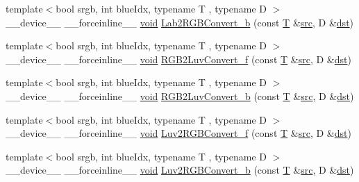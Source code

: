\begin{DoxyCompactItemize}
\item 
{\footnotesize template$<$bool srgb, int blue\-Idx, typename T , typename D $>$ }\\\-\_\-\-\_\-device\-\_\-\-\_\- \-\_\-\-\_\-forceinline\-\_\-\-\_\- \hyperlink{legacy_8hpp_a8bb47f092d473522721002c86c13b94e}{void} \hyperlink{namespacecv_1_1gpu_1_1device_1_1color__detail_a6b0bbe96c8d4e80e88474c4a726bd03e}{Lab2\-R\-G\-B\-Convert\-\_\-b} (const \hyperlink{calib3d_8hpp_a3efb9551a871ddd0463079a808916717}{T} \&\hyperlink{legacy_8hpp_a371cd109b74033bc4366f584edd3dacc}{src}, D \&\hyperlink{photo__c_8h_aed13e2a25279b24dc954073233fef7a5}{dst})
\item 
{\footnotesize template$<$bool srgb, int blue\-Idx, typename T , typename D $>$ }\\\-\_\-\-\_\-device\-\_\-\-\_\- \-\_\-\-\_\-forceinline\-\_\-\-\_\- \hyperlink{legacy_8hpp_a8bb47f092d473522721002c86c13b94e}{void} \hyperlink{namespacecv_1_1gpu_1_1device_1_1color__detail_aace7150463a11bee146c2cf36fdebd8b}{R\-G\-B2\-Luv\-Convert\-\_\-f} (const \hyperlink{calib3d_8hpp_a3efb9551a871ddd0463079a808916717}{T} \&\hyperlink{legacy_8hpp_a371cd109b74033bc4366f584edd3dacc}{src}, D \&\hyperlink{photo__c_8h_aed13e2a25279b24dc954073233fef7a5}{dst})
\item 
{\footnotesize template$<$bool srgb, int blue\-Idx, typename T , typename D $>$ }\\\-\_\-\-\_\-device\-\_\-\-\_\- \-\_\-\-\_\-forceinline\-\_\-\-\_\- \hyperlink{legacy_8hpp_a8bb47f092d473522721002c86c13b94e}{void} \hyperlink{namespacecv_1_1gpu_1_1device_1_1color__detail_a786fe21f347e41d69de6ccb2136b6058}{R\-G\-B2\-Luv\-Convert\-\_\-b} (const \hyperlink{calib3d_8hpp_a3efb9551a871ddd0463079a808916717}{T} \&\hyperlink{legacy_8hpp_a371cd109b74033bc4366f584edd3dacc}{src}, D \&\hyperlink{photo__c_8h_aed13e2a25279b24dc954073233fef7a5}{dst})
\item 
{\footnotesize template$<$bool srgb, int blue\-Idx, typename T , typename D $>$ }\\\-\_\-\-\_\-device\-\_\-\-\_\- \-\_\-\-\_\-forceinline\-\_\-\-\_\- \hyperlink{legacy_8hpp_a8bb47f092d473522721002c86c13b94e}{void} \hyperlink{namespacecv_1_1gpu_1_1device_1_1color__detail_aab1c4297ad9db320e720b1882b6f7708}{Luv2\-R\-G\-B\-Convert\-\_\-f} (const \hyperlink{calib3d_8hpp_a3efb9551a871ddd0463079a808916717}{T} \&\hyperlink{legacy_8hpp_a371cd109b74033bc4366f584edd3dacc}{src}, D \&\hyperlink{photo__c_8h_aed13e2a25279b24dc954073233fef7a5}{dst})
\item 
{\footnotesize template$<$bool srgb, int blue\-Idx, typename T , typename D $>$ }\\\-\_\-\-\_\-device\-\_\-\-\_\- \-\_\-\-\_\-forceinline\-\_\-\-\_\- \hyperlink{legacy_8hpp_a8bb47f092d473522721002c86c13b94e}{void} \hyperlink{namespacecv_1_1gpu_1_1device_1_1color__detail_ad42c96fc54caf7cb75cbd0e47d9c15cc}{Luv2\-R\-G\-B\-Convert\-\_\-b} (const \hyperlink{calib3d_8hpp_a3efb9551a871ddd0463079a808916717}{T} \&\hyperlink{legacy_8hpp_a371cd109b74033bc4366f584edd3dacc}{src}, D \&\hyperlink{photo__c_8h_aed13e2a25279b24dc954073233fef7a5}{dst})
\end{DoxyCompactItemize}
